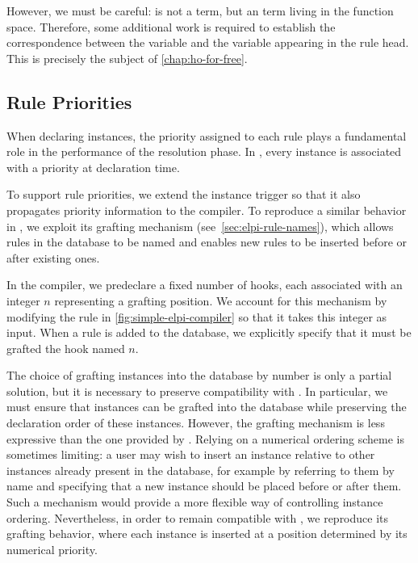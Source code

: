 However, we must be careful:  is not a \rocq term, but an \elpi term
living in the function space. Therefore, some additional work is required to
establish the correspondence between the variable  and the variable 
appearing in the rule head. This is precisely the subject of
\cref{chap:ho-for-free}.


\subsection{Rule Priorities}
\label{sec:rule-prio}

When declaring instances, the priority assigned to each rule plays a
fundamental role in the performance of the resolution phase. In \rocq,
every instance is associated with a priority at declaration time.

To support rule priorities, we extend the instance trigger so that it
also propagates priority information to the \elpi compiler. To reproduce
a similar behavior in \elpi, we exploit its grafting mechanism (see~\cref{sec:elpi-rule-names}), which
allows rules in the database to be named and enables new rules to be
inserted before or after existing ones.

In the \elpi compiler, we predeclare a fixed number of hooks, each
associated with an integer $n$ representing a grafting position. We
account for this mechanism by modifying the  rule in
\cref{fig:simple-elpi-compiler} so that it takes this integer as input.
When a rule is added to the database, we explicitly specify that it must
be grafted  the hook named $n$.

The choice of grafting \rocq instances into the \elpi database by number is only
a partial solution, but it is necessary to preserve compatibility with \rocq. In
particular, we must ensure that \rocq instances can be grafted into the \elpi
database while preserving the declaration order of these instances. However, the
\rocq grafting mechanism is less expressive than the one provided by \elpi.
Relying on a numerical ordering scheme is sometimes limiting: a user may wish to
insert an instance relative to other instances already present in the database,
for example by referring to them by name and specifying that a new instance
should be placed before or after them. Such a mechanism would provide a more
flexible way of controlling instance ordering. Nevertheless, in order to remain
compatible with \rocq, we reproduce its grafting behavior, where each instance
is inserted at a position determined by its numerical priority.

